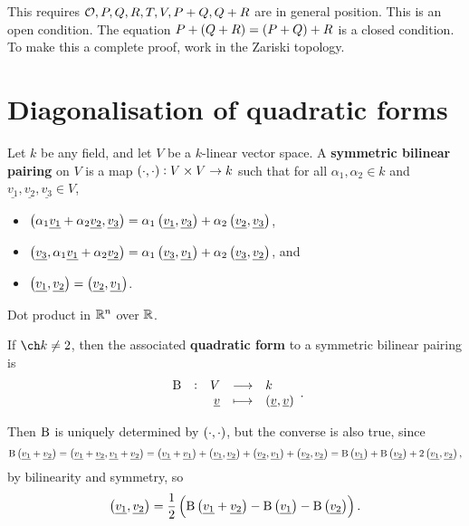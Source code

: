 \pagebreak

\begin{note*}
This requires $ \mathcal{O}, P, Q, R, T, V, P + Q, Q + R $ are in general position. This is an open condition. The equation $ P + \br{Q + R} = \br{P + Q} + R $ is a closed condition. To make this a complete proof, work in the Zariski topology.
\end{note*}

\pagebreak

\appendix

\section{Diagonalisation of quadratic forms}

\begin{definition}
Let $ k $ be any field, and let $ V $ be a $ k $-linear vector space. A \textbf{symmetric bilinear pairing} on $ V $ is a map $ \br{\cdot, \cdot} : V \times V \to k $ such that for all $ \alpha_1, \alpha_2 \in k $ and $ \underline{v_1}, \underline{v_2}, \underline{v_3} \in V $,
\begin{itemize}
\item $ \br{\alpha_1\underline{v_1} + \alpha_2\underline{v_2}, \underline{v_3}} = \alpha_1\br{\underline{v_1}, \underline{v_3}} + \alpha_2\br{\underline{v_2}, \underline{v_3}} $,
\item $ \br{\underline{v_3}, \alpha_1\underline{v_1} + \alpha_2\underline{v_2}} = \alpha_1\br{\underline{v_3}, \underline{v_1}} + \alpha_2\br{\underline{v_3}, \underline{v_2}} $, and
\item $ \br{\underline{v_1}, \underline{v_2}} = \br{\underline{v_2}, \underline{v_1}} $.
\end{itemize}
\end{definition}

\begin{example}
Dot product in $ \mathbb{R}^n $ over $ \mathbb{R} $.
\end{example}

\begin{definition}
If $ \ch k \ne 2 $, then the associated \textbf{quadratic form} to a symmetric bilinear pairing is
$$ \function[\B]{V}{k}{\underline{v}}{\br{\underline{v}, \underline{v}}}. $$
\end{definition}

\begin{remark}
Then $ \mathrm{B} $ is uniquely determined by $ \br{\cdot, \cdot} $, but the converse is also true, since
$$ \B\br{\underline{v_1} + \underline{v_2}} = \br{\underline{v_1} + \underline{v_2}, \underline{v_1} + \underline{v_2}} = \br{\underline{v_1} + \underline{v_1}} + \br{\underline{v_1}, \underline{v_2}} + \br{\underline{v_2}, \underline{v_1}} + \br{\underline{v_2}, \underline{v_2}} = \B\br{\underline{v_1}} + \B\br{\underline{v_2}} + 2\br{\underline{v_1}, \underline{v_2}}, $$
by bilinearity and symmetry, so
$$ \br{\underline{v_1}, \underline{v_2}} = \dfrac{1}{2}\br{\B\br{\underline{v_1} + \underline{v_2}} - \B\br{\underline{v_1}} - \B\br{\underline{v_2}}}. $$
\end{remark}

